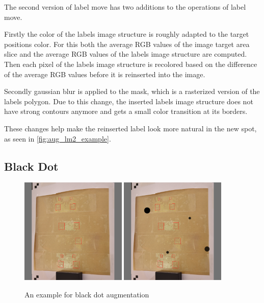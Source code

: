 \documentclass[10pt]{book}
\begin{document}
The second version of label move has two additions to the operations of label move. 

Firstly the color of the labels image structure is roughly adapted to the target positions color. For this both the average RGB values of the image target area slice and the average RGB values of the labels image structure are computed. Then each pixel of the labels image structure is recolored based on the difference of the average RGB values before it is reinserted into the image.

Secondly gaussian blur is applied to the mask, which is a rasterized version of the labels polygon. Due to this change, the inserted labels image structure does not have strong contours anymore and gets a small color transition at its borders.

These changes help make the reinserted label look more natural in the new spot, as seen in \autoref{fig:aug_lm2_example}.

\subsection{Black Dot}

\begin{figure}
  \centering
     {\includegraphics[width=0.45\textwidth]{image/aug_bd_before}}
     {\includegraphics[width=0.45\textwidth]{image/aug_bd_after}}
  \caption{An example for black dot augmentation}
  \label{fig:aug_bd_example}
\end{figure}
\end{document}
